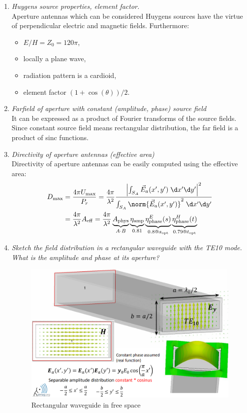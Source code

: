 \documentclass[11pt,a4paper]{article}
\begin{document}
\begin{enumerate}
    \item \emph{Huygens source properties, element factor.}\\
    Aperture antennas which can be considered Huygens sources have the virtue of perpendicular electric and magnetic fields. Furthermore:
    \begin{itemize}
        \item $E/H = Z_0 = 120\pi$,
        \item locally a plane wave,
        \item radiation pattern is a cardioid,
        \item element factor $(1+\cos(\theta))/2$.
    \end{itemize}

    \item \emph{Farfield of aperture with constant (amplitude, phase) source field}\\
    It can be expressed as a product of Fourier transforms of the source fields. Since constant source field means rectangular distribution, the far field is a product of sinc functions.

    \item \emph{Directivity of aperture antennas (effective area)}\\
    Directivity of aperture antennas can be easily computed using the effective area:
    \begin{align*}
        D_{\mathrm{max}} &= \frac{4\pi U_{\mathrm{max}}}{P_r} = \frac{4\pi}{\lambda^2}\frac{\left| \int_{S_A} \vec E_a(x',y') \; \d x' \d y' \right|^2}{\int_{S_A} \norm{\vec E_a(x',y')}^2 \; \d x' \d y'}
    \\
        &= \frac{4\pi}{\lambda^2} A_{\mathrm{eff}} = \frac{4\pi}{\lambda^2} \underbrace{A_{\mathrm{phys}}}_{A\cdot B}\underbrace{\eta_{\mathrm{amp}}}_{0.81}\underbrace{\eta^E_{\mathrm{phase}}(s)}_{0.8@s_{\mathrm{opt}}}\underbrace{\eta^H_{\mathrm{phase}}(t)}_{0.79@t_{\mathrm{opt}}}
    \end{align*}

    \item \emph{Sketch the field distribution in a rectangular waveguide with the TE10 mode. What is the amplitude and phase at its aperture?}
    \begin{figure}[!ht]
        \centering
        \includegraphics[width=.7\textwidth]{src/rectangular-waveguide-aperture.png}
        \caption{\label{fig:rectangular-waveguide-aperture}Rectangular waveguide in free space}
    \end{figure}


\end{enumerate}
\end{document}
